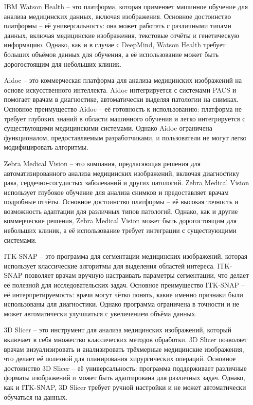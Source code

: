 {  \par \redline IBM Watson Health – это платформа, которая применяет машинное обучение для анализа медицинских данных, включая изображения. Основное достоинство платформы – её универсальность: она может работать с различными типами данных, включая медицинские изображения, текстовые отчёты и генетическую информацию. Однако, как и в случае с DeepMind, Watson Health требует больших объёмов данных для обучения, а её использование может быть дорогостоящим для небольших клиник.

  \par \redline Aidoc – это коммерческая платформа для анализа медицинских изображений на основе искусственного интеллекта. Aidoc интегрируется с системами PACS и помогает врачам в диагностике, автоматически выделяя патологии на снимках. Основное преимущество Aidoc – её готовность к использованию: платформа не требует глубоких знаний в области машинного обучения и легко интегрируется с существующими медицинскими системами. Однако Aidoc ограничена функционалом, предоставляемым разработчиками, и пользователи не могут легко модифицировать алгоритмы.

  \par \redline Zebra Medical Vision – это компания, предлагающая решения для автоматизированного анализа медицинских изображений, включая диагностику рака, сердечно-сосудистых заболеваний и других патологий. Zebra Medical Vision использует глубокое обучение для анализа снимков и предоставляет врачам подробные отчёты. Основное достоинство платформы – её высокая точность и возможность адаптации для различных типов патологий. Однако, как и другие коммерческие решения, Zebra Medical Vision может быть дорогостоящим для небольших клиник, а её использование требует интеграции с существующими системами.

  \par \redline ITK-SNAP – это программа для сегментации медицинских изображений, которая использует классические алгоритмы для выделения областей интереса. ITK-SNAP позволяет врачам вручную настраивать параметры сегментации, что делает её полезной для исследовательских задач. Основное преимущество ITK-SNAP – её интерпретируемость: врачи могут чётко понять, какие именно признаки были использованы для диагностики. Однако программа ограничена в точности и не может автоматически улучшаться с увеличением объёма данных.

  \par \redline 3D Slicer – это инструмент для анализа медицинских изображений, который включает в себя множество классических методов обработки. 3D Slicer позволяет врачам визуализировать и анализировать трёхмерные медицинские изображения, что делает её полезной для планирования хирургических операций. Основное достоинство 3D Slicer – её универсальность: программа поддерживает различные форматы изображений и может быть адаптирована для различных задач. Однако, как и ITK-SNAP, 3D Slicer требует ручной настройки и не может автоматически обучаться на данных.

}
